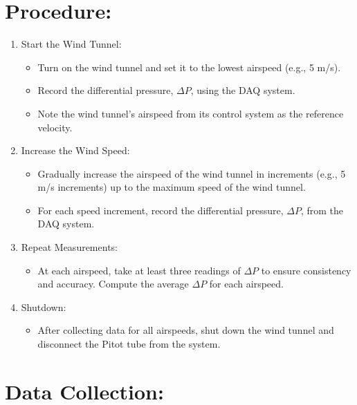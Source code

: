 \documentclass[12pt]{article}
\begin{document}
\section{Procedure:} 
\begin{enumerate}
\item Start the Wind Tunnel:
\begin{itemize}
\item Turn on the wind tunnel and set it to the lowest airspeed (e.g., 5 m/s).
\item Record the differential pressure, $\Delta P$, using the DAQ system.
\item Note the wind tunnel’s airspeed from its control system as the reference velocity.
\end{itemize}
\item Increase the Wind Speed:
\begin{itemize}
\item Gradually increase the airspeed of the wind tunnel in increments (e.g., 5 m/s increments) up to the maximum speed of the wind tunnel.
\item For each speed increment, record the differential pressure, $\Delta P$, from the DAQ system.
\end{itemize}
\item Repeat Measurements:
\begin{itemize}
\item At each airspeed, take at least three readings of $\Delta P$ to ensure consistency and accuracy. Compute the average $\Delta P$ for each airspeed.
\end{itemize}
\item Shutdown:
\begin{itemize}
\item After collecting data for all airspeeds, shut down the wind tunnel and disconnect the Pitot tube from the system.
\end{itemize}
\end{enumerate}
\clearpage

\section{Data Collection:} 
\end{document}
